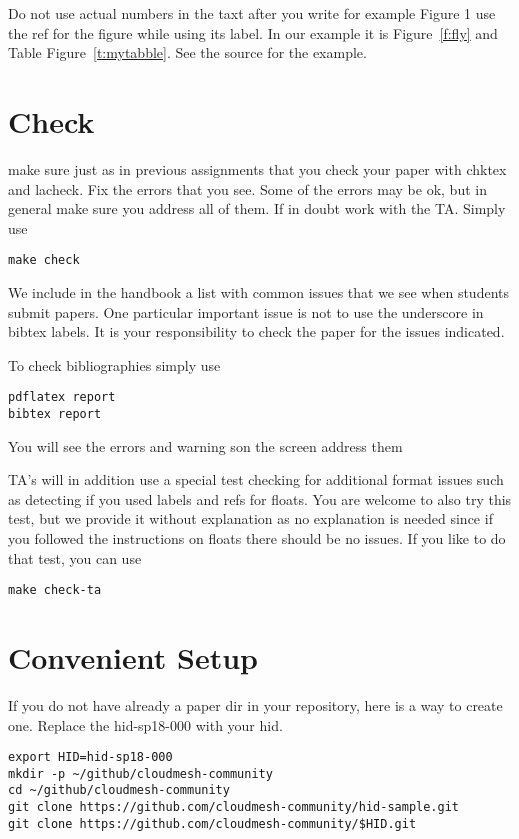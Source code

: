 Do not use actual numbers in the taxt after you write for example
Figure 1 use the ref for the figure while using its label. In our
example it is Figure~\ref{f:fly} and Table Figure~\ref{t:mytabble}.
See the source for the example.

\section{Check}

make sure just as in previous assignments that you check your paper
with chktex and lacheck. Fix the errors that you see. Some of the
errors may be ok, but in general make sure you address all of them. If
in doubt work with the TA. Simply use

\begin{verbatim}
make check
\end{verbatim}

We include in the handbook a list with common issues that we see when
students submit papers. One particular important issue is not to use
the underscore in bibtex labels. It is your responsibility to check
the paper for the issues indicated.

To check bibliographies simply use

\begin{verbatim}
pdflatex report
bibtex report
\end{verbatim}

You will see the errors and warning son the screen address them

TA's will in addition use a special test checking for additional
format issues such as detecting if you used labels and refs for
floats. You are welcome to also try this test, but we provide it
without explanation as no explanation is needed since if you followed
the instructions on floats there should be no issues. If you like to
do that test, you can use  

\begin{verbatim}
make check-ta
\end{verbatim}

\section{Convenient Setup}

If you do not have already a paper dir in your repository, here is a
way to create one. Replace the hid-sp18-000 with your hid.

\begin{verbatim}
export HID=hid-sp18-000
mkdir -p ~/github/cloudmesh-community
cd ~/github/cloudmesh-community
git clone https://github.com/cloudmesh-community/hid-sample.git
git clone https://github.com/cloudmesh-community/$HID.git
\end{verbatim}


